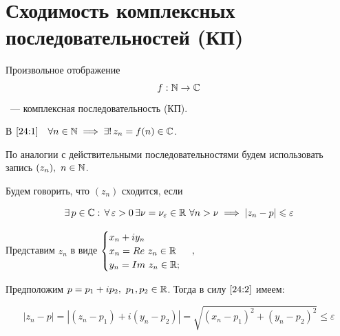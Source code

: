 \documentclass[../../main.tex]{subfiles}
\begin{document}
\section{Сходимость комплексных последовательностей (КП)}

Произвольное отображение
\begin{equation}\label{24:1}
f: \mathbb{N} \to \mathbb{C}
\end{equation}
~--- комплексная последовательность (КП).

В $ \eqref{24:1} \quad \forall n \in \mathbb{N} \implies \exists!\, z_n = f(n) \in \mathbb{C} $.

По аналогии с действительными последовательностями будем использовать запись $ (z_n),\ n \in \mathbb{N} $.

Будем говорить, что $ (z_n) $ сходится, если

\begin{equation}\label{24:2}
	\exists\, p \in \mathbb{C} :\, \forall\, \varepsilon > 0\, \exists \nu = \nu_\varepsilon \in \mathbb{R} \ \forall n > \nu \implies |z_n - p| \leqslant \varepsilon
\end{equation}

Представим $ z_n $ в виде
$\begin{cases}
x_n + i y_n  \\
x_n = Re\ z_n \in \mathbb{R} \\
y_n = Im\ z_n \in \mathbb{R};
\end{cases},\ $

Предположим $ p = p_1 + i p_2,\ p_1, p_2 \in \mathbb{R} $. Тогда в силу $ \eqref{24:2} $ имеем:

\begin{equation}\label{24:3}
	|z_n - p| = |(z_n - p_1) + i(y_n - p_2)| = \sqrt{(x_n - p_1)^2 + (y_n - p_2)^2} \leq \varepsilon
\end{equation}
\end{document}
